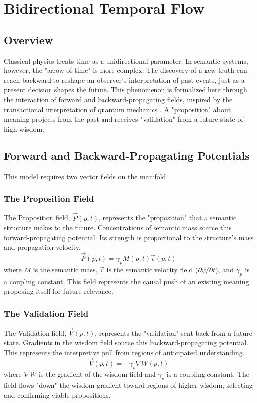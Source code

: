 \chapter{Bidirectional Temporal Flow}

\section{Overview}

Classical physics treats time as a unidirectional parameter. In semantic systems, however, the "arrow of time" is more complex. The discovery of a new truth can reach backward to reshape an observer's interpretation of past events, just as a present decision shapes the future. This phenomenon is formalized here through the interaction of forward and backward-propagating fields, inspired by the transactional interpretation of quantum mechanics \autocite{Cramer1986}. A "proposition" about meaning projects from the past and receives "validation" from a future state of high wisdom.

\section{Forward and Backward-Propagating Potentials}

This model requires two vector fields on the manifold.

\subsection{The Proposition Field}
The Proposition field, \(\vec{P}(p,t)\), represents the "proposition" that a semantic structure makes to the future. Concentrations of semantic mass source this forward-propagating potential. Its strength is proportional to the structure's mass and propagation velocity.
\begin{equation}
\vec{P}(p,t) = \gamma_p M(p,t) \vec{v}(p,t)
\end{equation}
where \(M\) is the semantic mass, \(\vec{v}\) is the semantic velocity field (\(\partial\psi/\partial t\)), and \(\gamma_p\) is a coupling constant. This field represents the causal push of an existing meaning proposing itself for future relevance.

\subsection{The Validation Field}
The Validation field, \(\vec{V}(p,t)\), represents the "validation" sent back from a future state. Gradients in the wisdom field source this backward-propagating potential. This represents the interpretive pull from regions of anticipated understanding.
\begin{equation}
\vec{V}(p,t) = -\gamma_v \nabla W(p,t)
\end{equation}
where \(\nabla W\) is the gradient of the wisdom field and \(\gamma_v\) is a coupling constant. The field flows "down" the wisdom gradient toward regions of higher wisdom, selecting and confirming viable propositions.

